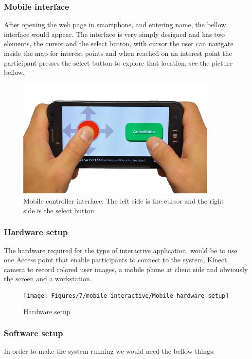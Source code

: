\subsubsection{Mobile interface}
After opening the web page in smartphone, and entering name, the bellow interface would appear. The interface is very simply designed and has two elements, the cursor and the select button, with cursor the user can navigate inside the map for interest points and when reached on an interest point the participant presses the select button to explore that location, see the picture bellow.

\begin{figure}[H]
    \centering
    \includegraphics[width=100mm,height=60mm]{Figures/7/mobile_interactive/mobile_interface}
    \caption{Mobile controller interface: The left side is the cursor and the right side is the select button.}%
    \label{fig:mobile_controllerinterface}%
\end{figure}



\subsubsection{Hardware setup}
The hardware required for the type of interactive application, would be to use one Access point that enable participants to connect to the system, Kinect camera to record colored user images, a mobile phone at client side and obviously the screen and a workstation.


\begin{figure}[H]
    \centering
    \texttt{[image: Figures/7/mobile\_interactive/Mobile\_hardware\_setup]}
    \caption{Hardware setup}%
    \label{fig:mobile_hardware_setup}%
\end{figure}


\subsubsection{Software setup}
In order to make the system running we would need the bellow things.

